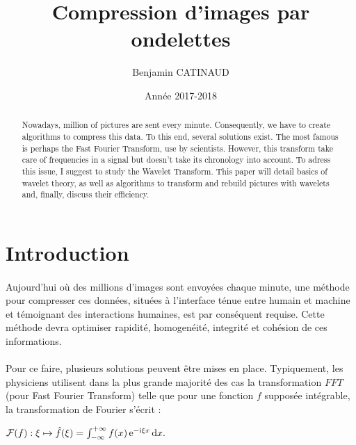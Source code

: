 \documentclass[a4paper,10pt]{report}
\title{Compression d'images par ondelettes}
\author{Benjamin CATINAUD}
\date{Ann\'{e}e 2017-2018}
\theoremstyle{break}
\begin{document}
\maketitle

\begin{abstract}
  Nowadays, million of pictures are sent every minute. Consequently, we have to create algorithms to compress this data.
  To this end, several solutions exist. The most famous is perhaps the Fast Fourier Transform, use by scientists. 
  However, this transform take care of frequencies in a signal but doesn't take its chronology into account. 
  To adress this issue, I suggest to study the Wavelet Transform. This paper will detail basics of wavelet theory, 
  as well as algorithms to transform and rebuild pictures with wavelets and, finally, discuss their efficiency.
\end{abstract}

\newpage

\section*{Introduction}

  \paragraph{} Aujourd'hui o\`{u} des millions d'images sont envoy\'{e}es chaque minute, une m\'{e}thode pour compresser ces donn\'{e}es,
    situ\'{e}es \`{a} l'interface t\'{e}nue entre humain et machine et t\'{e}moignant des interactions humaines, est par cons\'{e}quent requise. 
    Cette m\'{e}thode devra optimiser rapidit\'{e}, homogen\'{e}it\'{e}, integrit\'{e} et coh\'{e}sion de ces informations.
    
  \paragraph{} Pour ce faire, plusieurs solutions peuvent \^{e}tre mises en place. Typiquement, les physiciens utilisent dans la plus grande
    majorit\'{e} des cas la transformation $FFT$ (pour Fast Fourier Transform) telle que pour une fonction $f$ suppos\'{e}e int\'{e}grable, 
    la transformation de Fourier s'\'{e}crit :
	\begin{center}
	  ${\mathcal {F}}(f):\xi \mapsto {\hat {f}}(\xi )=\int _{-\infty }^{+\infty }f(x)\,\mathrm {e} ^{-{\rm {i}}\xi x}\,\mathrm {d} x. $
	\end{center}
	
\end{document}
